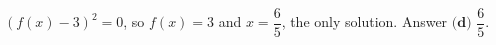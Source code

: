 $(f(x)-3)^2=0$, so $f(x)=3$ and $x=\dfrac65$, the only solution. Answer $\boxed{\textbf{(d) }\dfrac65}$.
